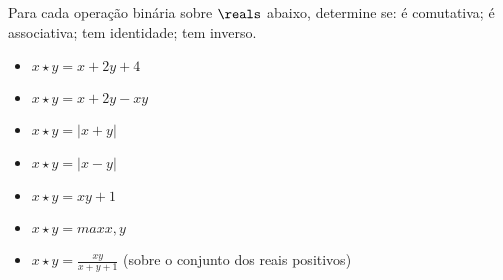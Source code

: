 \begin{exercise}
	Para cada operação binária sobre $\reals$ abaixo, determine se: é comutativa; é associativa; tem identidade; tem inverso.
	\begin{itemize}
		\item $x \star y = x + 2y + 4$   
		\item $x \star y = x + 2y - xy$
		\item $x \star y = |x + y|$
		\item $x \star y = |x - y|$
		\item $x \star y = xy + 1$
		\item $x \star y = max{x, y}$
		\item $x \star y = \frac{xy}{x + y + 1}$ (sobre o conjunto dos reais positivos)
	\end{itemize}
\end{exercise}